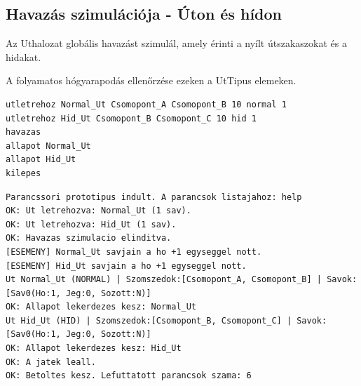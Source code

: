 \subsection{Havazás szimulációja - Úton és hídon}
\begin{test-case-description}
    Az Uthalozat globális havazást szimulál, amely érinti a nyílt útszakaszokat és a hidakat.
\end{test-case-description}
\begin{test-case-function}
    A folyamatos hógyarapodás ellenőrzése ezeken a UtTipus elemeken.
\end{test-case-function}
\begin{test-case-input}
\begin{verbatim}
utletrehoz Normal_Ut Csomopont_A Csomopont_B 10 normal 1
utletrehoz Hid_Ut Csomopont_B Csomopont_C 10 hid 1
havazas
allapot Normal_Ut
allapot Hid_Ut
kilepes
\end{verbatim}
\end{test-case-input}
\begin{test-case-output}
\begin{verbatim}
Parancssori prototipus indult. A parancsok listajahoz: help
OK: Ut letrehozva: Normal_Ut (1 sav).
OK: Ut letrehozva: Hid_Ut (1 sav).
OK: Havazas szimulacio elinditva.
[ESEMENY] Normal_Ut savjain a ho +1 egyseggel nott.
[ESEMENY] Hid_Ut savjain a ho +1 egyseggel nott.
Ut Normal_Ut (NORMAL) | Szomszedok:[Csomopont_A, Csomopont_B] | Savok: [Sav0(Ho:1, Jeg:0, Sozott:N)]
OK: Allapot lekerdezes kesz: Normal_Ut
Ut Hid_Ut (HID) | Szomszedok:[Csomopont_B, Csomopont_C] | Savok: [Sav0(Ho:1, Jeg:0, Sozott:N)]
OK: Allapot lekerdezes kesz: Hid_Ut
OK: A jatek leall.
OK: Betoltes kesz. Lefuttatott parancsok szama: 6
\end{verbatim}
\end{test-case-output}

